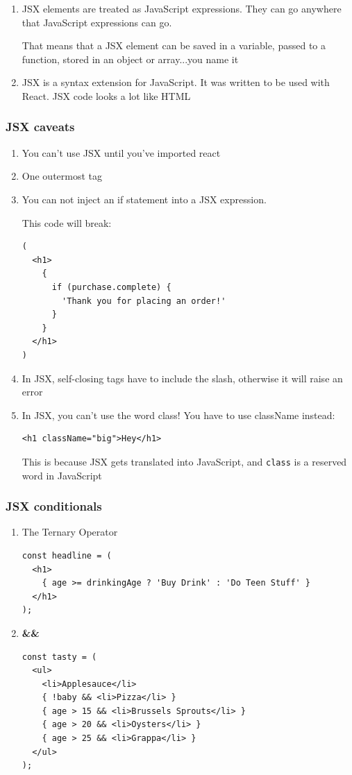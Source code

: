 \documentclass[a4paper, 12pt]{article}
\begin{document}
\begin{enumerate}
\item JSX elements are treated as JavaScript expressions. They can go anywhere that JavaScript expressions can go.

That means that a JSX element can be saved in a variable, passed to a function, stored in an object or array...you name it

\item JSX is a syntax extension for JavaScript. It was written to be used with React. JSX code looks a lot like HTML
\end{enumerate}

\subsubsection{JSX caveats}
\begin{enumerate}

\item You can't use JSX until you've imported react

\item One outermost tag

\item You can not inject an if statement into a JSX expression.

This code will break:
\begin{verbatim}
(
  <h1>
    {
      if (purchase.complete) {
        'Thank you for placing an order!'
      }
    }
  </h1>
)
\end{verbatim}

\item In JSX, self-closing tags have to include the slash, otherwise it will raise an error

\item In JSX, you can't use the word class! You have to use className instead:
\begin{verbatim}
<h1 className="big">Hey</h1>
\end{verbatim}
This is because JSX gets translated into JavaScript, and \verb|class| is a reserved word in JavaScript

\end{enumerate}

\subsubsection{JSX conditionals}
\begin{enumerate}
\item The Ternary Operator
\begin{verbatim}
const headline = (
  <h1>
    { age >= drinkingAge ? 'Buy Drink' : 'Do Teen Stuff' }
  </h1>
);
\end{verbatim}
\item \textbf{\&\&}
\begin{verbatim}
const tasty = (
  <ul>
    <li>Applesauce</li>
    { !baby && <li>Pizza</li> }
    { age > 15 && <li>Brussels Sprouts</li> }
    { age > 20 && <li>Oysters</li> }
    { age > 25 && <li>Grappa</li> }
  </ul>
);
\end{verbatim}
\end{enumerate}
\end{document}
